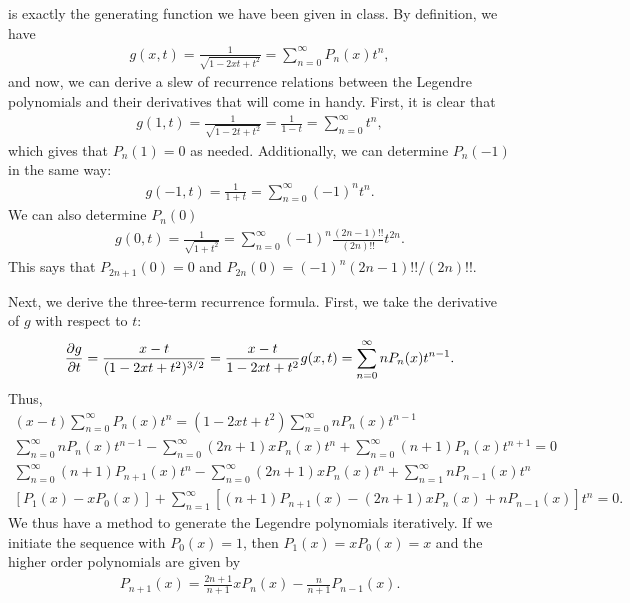  is exactly the generating function we have been given in class.
By definition, we have
\begin{eqnarray}
    g(x,t) = \frac{1}{\sqrt{1 - 2xt + t^2}} = \sum_{n=0}^{\infty} P_{n}(x) t^{n}
,\end{eqnarray}
and now, we can derive a slew of recurrence relations between the Legendre polynomials and their derivatives that will come in handy.
First, it is clear that
\begin{eqnarray}
    g(1,t) = \frac{1}{\sqrt{1-2t+t^2}} = \frac{1}{1 - t} = \sum_{n=0}^{\infty} t^{n}
,\end{eqnarray}
which gives that $P_{n}(1) = 0$ as needed.
Additionally, we can determine $P_{n}(-1)$ in the same way:
\begin{eqnarray}
    g(-1,t) = \frac{1}{1 + t} = \sum_{n=0}^{\infty} (-1)^{n} t^{n}
.\end{eqnarray}
We can also determine $P_{n}(0)$
\begin{eqnarray}
    g(0,t) = \frac{1}{\sqrt{1 + t^2}} = \sum_{n=0}^{\infty} (-1)^{n} \frac{(2n-1)!!}{(2n)!!} t^{2n}
.\end{eqnarray}
This says that $P_{2n+1}(0) = 0$ and $P_{2n}(0) = (-1)^{n} (2n-1)!!/(2n)!!$.

Next, we derive the three-term recurrence formula.
First, we take the derivative of $g$ with respect to $t$:
\begin{eqnarray}
    \pdv{g}{t} = \frac{x-t}{(1 - 2xt + t^2)^{3/2}} = \frac{x-t}{1-2xt+t^2} g(x,t) = \sum_{n=0}^{\infty} n P_{n}(x) t^{n-1}
.\end{eqnarray}
Thus,
\begin{gather}
    (x-t) \sum_{n=0}^{\infty} P_{n}(x) t^{n} = (1 - 2xt + t^2) \sum_{n=0}^{\infty} n P_{n}(x) t^{n-1} \nonumber \\
    \sum_{n=0}^{\infty} nP_{n}(x) t^{n-1} - \sum_{n=0}^{\infty} (2n + 1) x P_{n}(x) t^{n} + \sum_{n=0}^{\infty} (n+1) P_{n}(x) t^{n+1} = 0 \nonumber \\
    \sum_{n=0}^{\infty} (n+1) P_{n+1}(x) t^{n} - \sum_{n=0}^{\infty} (2n+1) x P_{n}(x) t^{n} + \sum_{n=1}^{\infty} n P_{n-1}(x) t^{n} \nonumber \\
    [ P_1(x) - x P_0(x) ] + \sum_{n=1}^{\infty} [ (n+1)P_{n+1}(x) - (2n+1) x P_{n}(x) + n P_{n-1}(x) ] t^{n} = 0
.\end{gather}
We thus have a method to generate the Legendre polynomials iteratively.
If we initiate the sequence with $P_0(x) = 1$, then $P_1(x) = xP_0(x) = x$ and the higher order polynomials are given by
\begin{eqnarray}
    \label{eq:gen-rec-relation}
    P_{n+1}(x) = \frac{2n+1}{n+1} x P_{n}(x) - \frac{n}{n+1} P_{n-1}(x)
.\end{eqnarray}


